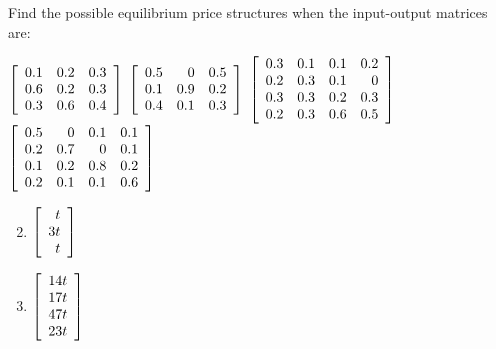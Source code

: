 \begin{multicols}{2}
\vspace*{-2em}
\begin{ex}
Find the possible equilibrium price structures when the input-output matrices are:
\begin{exenumerate}
\exitem $\left[ \begin{array}{rrr}
0.1 & 0.2 & 0.3 \\
0.6 & 0.2 & 0.3 \\
0.3 & 0.6 & 0.4
\end{array} \right]$
\exitem $\left[ \begin{array}{rrr}
0.5 & 0 & 0.5 \\
0.1 & 0.9 & 0.2 \\
0.4 & 0.1 & 0.3
\end{array} \right]$
\exitem* $\left[ \begin{array}{rrrr}
0.3 & 0.1 & 0.1 & 0.2 \\
0.2 & 0.3 & 0.1 & 0 \\
0.3 & 0.3 & 0.2 & 0.3 \\
0.2 & 0.3 & 0.6 & 0.5
\end{array} \right]$
\exitem* $\left[ \begin{array}{rrrr}
0.5 & 0 & 0.1 & 0.1 \\
0.2 & 0.7 & 0 & 0.1 \\
0.1 & 0.2 & 0.8 & 0.2 \\
0.2 & 0.1 & 0.1 & 0.6
\end{array} \right]$
\end{exenumerate}
\begin{sol}
\begin{enumerate}[label={\alph*.}]
\setcounter{enumi}{1}
\item $\left[ \begin{array}{r}
t \\
3t \\
t
\end{array} \right]$

\setcounter{enumi}{3}
\item $\left[ \begin{array}{r}
14t \\
17t \\
47t \\
23t
\end{array} \right]$

\end{enumerate}
\end{sol}
\end{ex}


\end{multicols}
